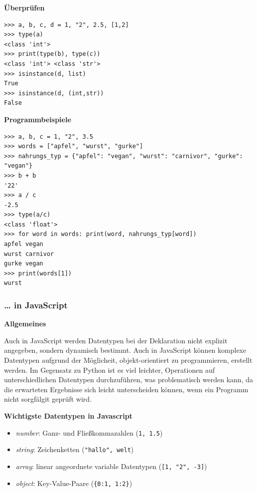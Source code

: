 \vspace{0.5cm}\par\noindent\textbf{Überprüfen}\vspace{0.5cm}

\begin{verbatim}
>>> a, b, c, d = 1, "2", 2.5, [1,2]
>>> type(a)
<class 'int'>
>>> print(type(b), type(c))
<class 'int'> <class 'str'>
>>> isinstance(d, list)
True
>>> isinstance(d, (int,str))
False
\end{verbatim}


\vspace{0.5cm}\par\noindent\textbf{Programmbeispiele}\vspace{0.5cm}

\begin{verbatim}
>>> a, b, c = 1, "2", 3.5
>>> words = ["apfel", "wurst", "gurke"]
>>> nahrungs_typ = {"apfel": "vegan", "wurst": "carnivor", "gurke": "vegan"}
>>> b + b
'22'
>>> a / c
-2.5
>>> type(a/c)
<class 'float'>
>>> for word in words: print(word, nahrungs_typ[word])
apfel vegan
wurst carnivor
gurke vegan
>>> print(words[1])
wurst
\end{verbatim}


\subsubsection{\texorpdfstring{{\ldots{} in
JavaScript}}{\ldots{} in JavaScript}}

\vspace{0.5cm}\par\noindent\textbf{Allgemeines}\vspace{0.5cm}

Auch in JavaScript werden Datentypen bei der Deklaration nicht explizit
angegeben, sondern dynamisch bestimmt. Auch in JavaScript können
komplexe Datentypen aufgrund der Möglicheit, objekt-orientiert zu
programmieren, erstellt werden. Im Gegensatz zu Python ist es viel
leichter, Operationen auf unterschiedlichen Datentypen durchzuführen,
was problematisch werden kann, da die erwarteten Ergebnisse sich leicht
unterscheiden können, wenn ein Programm nicht sorgfälgit geprüft wird.



\vspace{0.5cm}\par\noindent\textbf{Wichtigste Datentypen in Javascript}\vspace{0.5cm}

\begin{itemize}
\itemsep1pt\parskip0pt
\item
  {\emph{number}: Ganz- und Fließkommazahlen (\texttt{1,\ 1.5})}
\item
  {\emph{string}: Zeichenketten
  (\texttt{"hallo",\ \textquotesingle{}welt\textquotesingle{}})}
\item
  {\emph{array}: linear angeordnete variable Datentypen
  (\texttt{{[}1,\ "2",\ -3{]}})}
\item
  {\emph{object}: Key-Value-Paare (\texttt{\{0:1,\ 1:2\}})}
\end{itemize}

